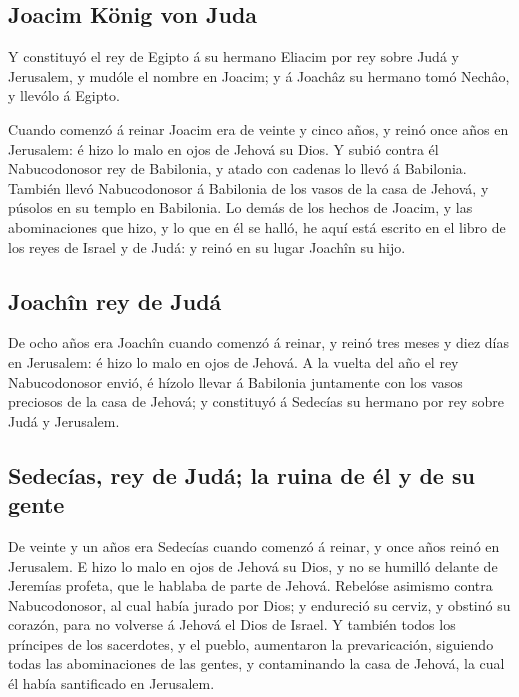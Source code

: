 \hypertarget{joacim-kuxf6nig-von-juda}{%
\subsection{Joacim König von Juda}\label{joacim-kuxf6nig-von-juda}}

 Y constituyó el rey de Egipto á su hermano Eliacim por
rey sobre Judá y Jerusalem, y mudóle el nombre en Joacim; y á Joachâz su
hermano tomó Nechâo, y llevólo á Egipto.

 Cuando comenzó á reinar Joacim era de veinte y cinco
años, y reinó once años en Jerusalem: é hizo lo malo en ojos de Jehová
su Dios.  Y subió contra él Nabucodonosor rey de
Babilonia, y atado con cadenas lo llevó á Babilonia. 
También llevó Nabucodonosor á Babilonia de los vasos de la casa de
Jehová, y púsolos en su templo en Babilonia.  Lo demás de
los hechos de Joacim, y las abominaciones que hizo, y lo que en él se
halló, he aquí está escrito en el libro de los reyes de Israel y de
Judá: y reinó en su lugar Joachîn su hijo.

\hypertarget{joachuxeen-rey-de-juduxe1}{%
\subsection{Joachîn rey de Judá}\label{joachuxeen-rey-de-juduxe1}}

 De ocho años era Joachîn cuando comenzó á reinar, y reinó
tres meses y diez días en Jerusalem: é hizo lo malo en ojos de Jehová.
 A la vuelta del año el rey Nabucodonosor envió, é hízolo
llevar á Babilonia juntamente con los vasos preciosos de la casa de
Jehová; y constituyó á Sedecías su hermano por rey sobre Judá y
Jerusalem.

\hypertarget{sedecuxedas-rey-de-juduxe1-la-ruina-de-uxe9l-y-de-su-gente}{%
\subsection{Sedecías, rey de Judá; la ruina de él y de su
gente}\label{sedecuxedas-rey-de-juduxe1-la-ruina-de-uxe9l-y-de-su-gente}}

 De veinte y un años era Sedecías cuando comenzó á
reinar, y once años reinó en Jerusalem.  E hizo lo malo
en ojos de Jehová su Dios, y no se humilló delante de Jeremías profeta,
que le hablaba de parte de Jehová.  Rebelóse asimismo
contra Nabucodonosor, al cual había jurado por Dios; y endureció su
cerviz, y obstinó su corazón, para no volverse á Jehová el Dios de
Israel.  Y también todos los príncipes de los sacerdotes,
y el pueblo, aumentaron la prevaricación, siguiendo todas las
abominaciones de las gentes, y contaminando la casa de Jehová, la cual
él había santificado en Jerusalem.

